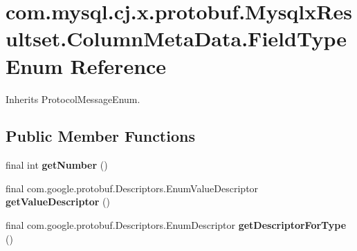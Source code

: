 \hypertarget{enumcom_1_1mysql_1_1cj_1_1x_1_1protobuf_1_1_mysqlx_resultset_1_1_column_meta_data_1_1_field_type}{}\section{com.\+mysql.\+cj.\+x.\+protobuf.\+Mysqlx\+Resultset.\+Column\+Meta\+Data.\+Field\+Type Enum Reference}
\label{enumcom_1_1mysql_1_1cj_1_1x_1_1protobuf_1_1_mysqlx_resultset_1_1_column_meta_data_1_1_field_type}


Inherits Protocol\+Message\+Enum.

\subsection*{Public Member Functions}
\begin{DoxyCompactItemize}
\item 
\mbox{\label{enumcom_1_1mysql_1_1cj_1_1x_1_1protobuf_1_1_mysqlx_resultset_1_1_column_meta_data_1_1_field_type_a22c4155f705dd97c86167f6d378b87cb}} 
final int {\bfseries get\+Number} ()
\item 
\mbox{\label{enumcom_1_1mysql_1_1cj_1_1x_1_1protobuf_1_1_mysqlx_resultset_1_1_column_meta_data_1_1_field_type_acfe1b01a0f1eb0d82b7735e5930be583}} 
final com.\+google.\+protobuf.\+Descriptors.\+Enum\+Value\+Descriptor {\bfseries get\+Value\+Descriptor} ()
\item 
\mbox{\label{enumcom_1_1mysql_1_1cj_1_1x_1_1protobuf_1_1_mysqlx_resultset_1_1_column_meta_data_1_1_field_type_a6cd807dea1565236f9f699e48e44f58c}} 
final com.\+google.\+protobuf.\+Descriptors.\+Enum\+Descriptor {\bfseries get\+Descriptor\+For\+Type} ()
\end{DoxyCompactItemize}
